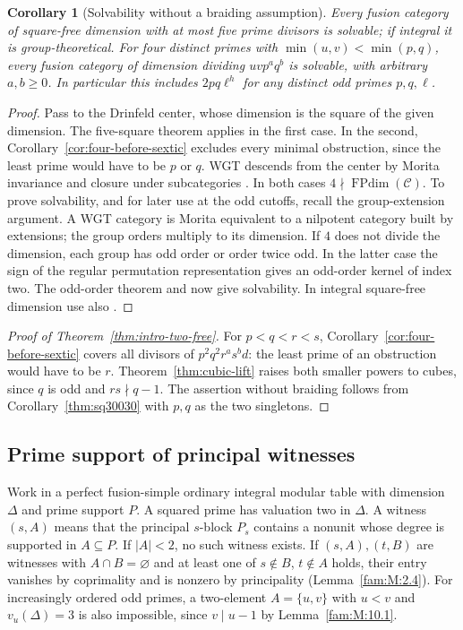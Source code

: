 \documentclass[11pt,a4paper]{article}
\numberwithin{equation}{section}
\newtheorem{corollary}[theorem]{Corollary}
\theoremstyle{remark}
\newcommand{\C}{\mathcal C}
\newcommand{\FPdim}{\operatorname{FPdim}}
\begin{document}
\begin{corollary}[Solvability without a braiding assumption]\label{fam:M:10.5}\label{thm:sq30030}
Every fusion category of square-free dimension with at most five
prime divisors is solvable; if integral it is group-theoretical.
For four distinct primes with $\min(u,v)<\min(p,q)$, every fusion
category of dimension dividing $uvp^a q^b$ is solvable, with arbitrary
$a,b\ge0$. In particular this includes $2pq\ell^h$ for any distinct
odd primes $p,q,\ell$.
\end{corollary}
\begin{proof}
Pass to the Drinfeld center, whose dimension is the square of the
given dimension. The five-square theorem applies in the first case.
In the second, Corollary~\ref{cor:four-before-sextic} excludes every
minimal obstruction, since the least prime would have to be $p$ or
$q$. WGT descends from the center by Morita invariance and closure
under subcategories \cite[Proposition~4.1]{ENOsolvable}. In both
cases $4\nmid\FPdim(\C)$. To prove solvability, and for later use
at the odd cutoffs, recall the group-extension argument. A WGT category is Morita equivalent to
a nilpotent category built by extensions; the group orders multiply
to its dimension. If $4$ does not divide the dimension, each group
has odd order or order twice odd. In the latter case the sign of the
regular permutation representation gives an odd-order kernel of index
two. The odd-order theorem \cite[p.~775]{FT} and \cite[Proposition~4.5(i)]{ENOsolvable} now give
solvability. In integral square-free dimension use also
\cite[Proposition~9.1]{ENOsolvable}.
\end{proof}

\begin{proof}[Proof of Theorem~\ref{thm:intro-two-free}]
For $p<q<r<s$, Corollary~\ref{cor:four-before-sextic} covers all
divisors of $p^2q^2r^a s^b d$: the least prime of an obstruction would
have to be $r$. Theorem~\ref{thm:cubic-lift} raises both smaller
powers to cubes, since $q$ is odd and $rs\nmid q-1$. The assertion
without braiding follows from Corollary~\ref{thm:sq30030} with $p,q$
as the two singletons.
\end{proof}


\subsection{Prime support of principal witnesses}

Work in a perfect fusion-simple ordinary integral modular table with
dimension $\Delta$ and prime support $P$. A squared prime has valuation
two in $\Delta$. A witness $(s,A)$ means that
the principal $s$-block $P_s$ contains a nonunit whose degree is
supported in $A\subseteq P$. If $|A|<2$, no such witness exists.
If $(s,A),(t,B)$ are witnesses with $A\cap B=\varnothing$ and at
least one of $s\notin B$, $t\notin A$ holds, their entry vanishes by coprimality and
is nonzero by principality (Lemma~\ref{fam:M:2.4}). For increasingly
ordered odd primes, a two-element $A=\{u,v\}$ with $u<v$ and
$v_u(\Delta)=3$ is also impossible, since $v\mid u-1$ by
Lemma~\ref{fam:M:10.1}.
\end{document}
